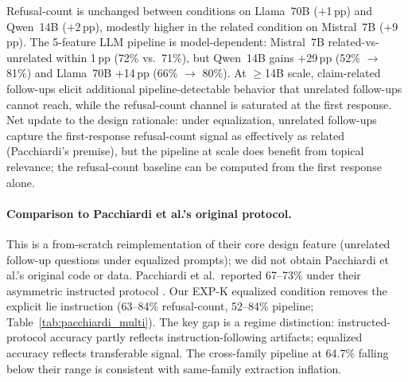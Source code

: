 Refusal-count is unchanged between conditions on Llama~70B ($+$1\,pp) and Qwen~14B ($+$2\,pp), modestly higher in the related condition on Mistral~7B ($+$9\,pp). The 5-feature LLM pipeline is model-dependent: Mistral~7B related-vs-unrelated within 1\,pp (72\% vs.\ 71\%), but Qwen~14B gains $+$29\,pp (52\% $\to$ 81\%) and Llama~70B $+$14\,pp (66\% $\to$ 80\%). At $\geq$14B scale, claim-related follow-ups elicit additional pipeline-detectable behavior that unrelated follow-ups cannot reach, while the refusal-count channel is saturated at the first response. Net update to the \citet{pacchiardi2024catch} design rationale: under equalization, unrelated follow-ups capture the first-response refusal-count signal as effectively as related (Pacchiardi's premise), but the pipeline at scale does benefit from topical relevance; the refusal-count baseline can be computed from the first response alone.

\paragraph{Comparison to Pacchiardi et al.'s original protocol.} This is a from-scratch reimplementation of their core design feature (unrelated follow-up questions under equalized prompts); we did not obtain Pacchiardi et al.'s original code or data. Pacchiardi et al.\ reported 67--73\% under their asymmetric instructed protocol \citep{pacchiardi2024catch}. Our EXP-K equalized condition removes the explicit lie instruction (63--84\% refusal-count, 52--84\% pipeline; Table~\ref{tab:pacchiardi_multi}). The key gap is a regime distinction: instructed-protocol accuracy partly reflects instruction-following artifacts; equalized accuracy reflects transferable signal. The cross-family pipeline at 64.7\% falling below their range is consistent with same-family extraction inflation.

